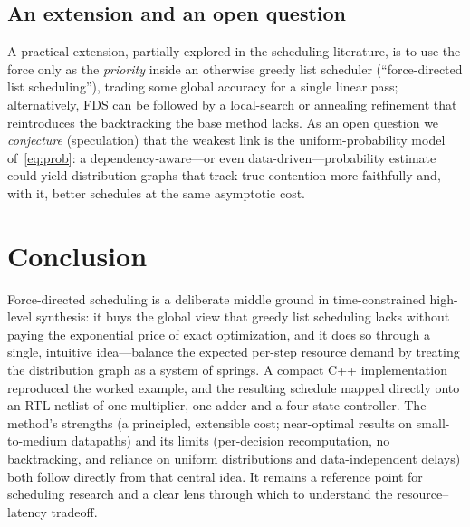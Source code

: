 \documentclass[conference]{IEEEtran}
\begin{document}
\subsection{An extension and an open question}
A practical extension, partially explored in the scheduling literature, is to
use the force only as the \emph{priority} inside an otherwise greedy list
scheduler (``force-directed list scheduling''), trading some global accuracy
for a single linear pass; alternatively, FDS can be followed by a
local-search or annealing refinement that reintroduces the backtracking the
base method lacks. As an open question we \emph{conjecture} (speculation) that
the weakest link is the uniform-probability model of~\eqref{eq:prob}: a
dependency-aware---or even data-driven---probability estimate could yield
distribution graphs that track true contention more faithfully and, with it,
better schedules at the same asymptotic cost.

\section{Conclusion}
Force-directed scheduling is a deliberate middle ground in time-constrained
high-level synthesis: it buys the global view that greedy list scheduling lacks
without paying the exponential price of exact optimization, and it does so
through a single, intuitive idea---balance the expected per-step resource
demand by treating the distribution graph as a system of springs. A compact C++
implementation reproduced the worked example, and the resulting schedule mapped
directly onto an RTL netlist of one multiplier, one adder and a four-state
controller. The method's strengths (a principled, extensible cost; near-optimal
results on small-to-medium datapaths) and its limits (per-decision
recomputation, no backtracking, and reliance on uniform distributions and
data-independent delays) both follow directly from that central idea. It remains
a reference point for scheduling research and a clear lens through which to
understand the resource--latency tradeoff.
\end{document}
